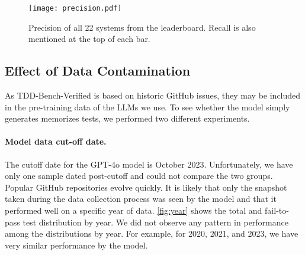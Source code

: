 \begin{figure}[!t]
    \centering
    \texttt{[image: precision.pdf]}
    \vspace{-10pt}
    \caption{Precision of all 22 systems from the leaderboard. Recall is also mentioned at the top of each bar.}
    \label{fig:precision}
\end{figure}







\subsection{Effect of Data Contamination}
\label{sec:rq7}

As TDD-Bench-Verified is based on historic GitHub issues, they may be included
in the pre-training data of the LLMs we use. To see whether the model simply
generates memorizes tests, we performed two different experiments.

\paragraph{Model data cut-off date.}

The cutoff date for the GPT-4o model is October 2023. Unfortunately, we have
only one sample dated post-cutoff and could not compare the two groups.  Popular
GitHub repositories evolve quickly. It is likely that only the snapshot taken
during the data collection process was seen by the model and that it performed
well on a specific year of data.  \cref{fig:year} shows the total and
fail-to-pass test distribution by year.  We did not observe any pattern in
performance among the distributions by year.  For example, for 2020, 2021, and
2023, we have very similar performance by the model.

